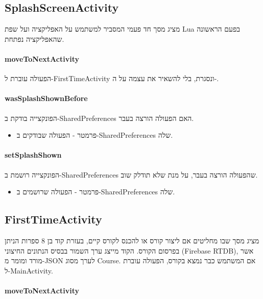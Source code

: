 \subsection*{SplashScreenActivity}

מציג מסך חד פעמי המסביר למשתמש על האפליקציה ועל שפת Lua בפעם הראשונה שהאפליקציה נפתחת.

\paragraph{moveToNextActivity}

הפעולה עוברת ל-FirstTimeActivity ונסגרת, בלי להשאיר את עצמה על ה-.

\paragraph{wasSplashShownBefore}

הפונקצייה בודקת ב-SharedPreferences האם הפעולה הורצה בעבר.

\begin{itemize}
  \item פרמטר  - הפעולה שבודקים ב-SharedPreferences שלה.
\end{itemize}

\paragraph{setSplashShown}

הפונקצייה רושמת ב-SharedPreferences שהפעולה הורצה בעבר, על מנת שלא תודלק שוב.

\begin{itemize}
  \item פרמטר  - הפעולה שרושמים ב-SharedPreferences שלה.
\end{itemize}

\subsection*{FirstTimeActivity}

מציג מסך שבו מחליטים אם ליצור קורס או להכנס לקורס קיים, בעזרת קוד בן 8 ספרות הניתן בפרסום הקורס.
הקוד מייצג ערך השמור בבסיס הנתונים החיצוני (Firebase RTDB), אשר מורד ומומר מ-JSON לערך מסוג Course.
אם המשתמש כבר נמצא בקורס, הפעולה עוברת ל-MainActivity.

\paragraph{moveToNextActivity}

